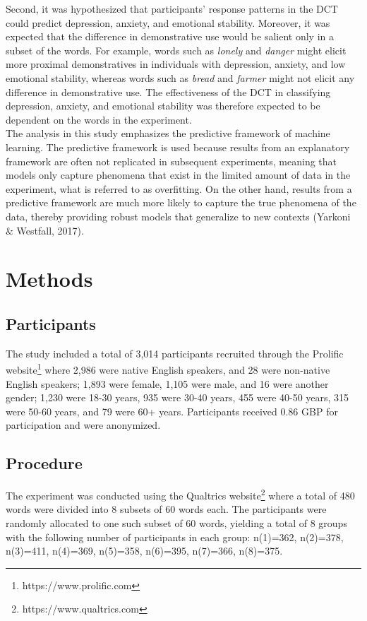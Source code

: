 \documentclass[11pt, a4paper]{article}
\begin{document}
Second, it was hypothesized that participants’ response patterns in the DCT could predict depression, anxiety, and emotional stability. Moreover, it was expected that the difference in demonstrative use would be salient only in a subset of the words. For example, words such as \textit{lonely} and \textit{danger} might elicit more proximal demonstratives in individuals with depression, anxiety, and low emotional stability, whereas words such as \textit{bread} and \textit{farmer} might not elicit any difference in demonstrative use. The effectiveness of the DCT in classifying depression, anxiety, and emotional stability was therefore expected to be dependent on the words in the experiment. \\

The analysis in this study emphasizes the predictive framework of machine learning. The predictive framework is used because results from an explanatory framework are often not replicated in subsequent experiments, meaning that models only capture phenomena that exist in the limited amount of data in the experiment, what is referred to as overfitting. On the other hand, results from a predictive framework are much more likely to capture the true phenomena of the data, thereby providing robust models that generalize to new contexts (Yarkoni \& Westfall, 2017).


\section{Methods}

\subsection{Participants}
The study included a total of 3,014 participants recruited through the Prolific website\footnote{https://www.prolific.com} where 2,986 were native English speakers, and 28 were non-native English speakers; 1,893 were female, 1,105 were male, and 16 were another gender; 1,230 were 18-30 years, 935 were 30-40 years, 455 were 40-50 years, 315 were 50-60 years, and 79 were 60+ years. Participants received 0.86 GBP for participation and were anonymized. 


\subsection{Procedure}
The experiment was conducted using the Qualtrics website\footnote{https://www.qualtrics.com} where a total of 480 words were divided into 8 subsets of 60 words each. The participants were randomly allocated to one such subset of 60 words, yielding a total of 8 groups with the following number of participants in each group: n(1)=362, n(2)=378, n(3)=411, n(4)=369, n(5)=358, n(6)=395, n(7)=366, n(8)=375. \\
\end{document}
